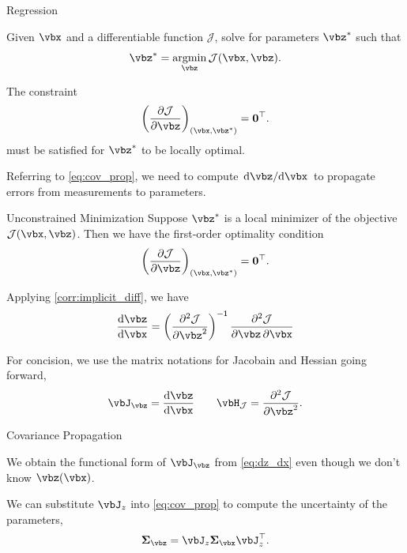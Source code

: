 \documentclass[8pt,aspectratio=169]{beamer}
\begin{document}
\begin{frame}{Regression}
  \begin{problem}[Optimization]
    Given $\vbx$ and a differentiable function $\mathcal{J}$, solve for
    parameters $\vbz^{*}$ such that
    \[
      \label{eq:minimization_problem}
      \vbz^{*} = \argmin_{\vbz} \mathcal{J}(\vbx,\vbz).
    \]
  \end{problem}

  \smallskip

  \begin{definition}
    The constraint
    \[
      \pdv{\mathcal{J}}{\vbz}_{(\vbx,\vbz^*)} = \vbzero^{\T}.
    \]
    must be satisfied for $\vbz^*$ to be locally optimal.
  \end{definition}

  \smallskip

  \begin{desiderata}
    Referring to \eqref{eq:cov_prop}, we need to compute
    $\odv{\vbz}/{\vbx}$ to propagate errors from measurements to
    parameters.
  \end{desiderata}
\end{frame}


\begin{frame}[fragile]{Unconstrained Minimization}
  Suppose $\vbz^*$ is a local minimizer of the objective
  $\mathcal{J}(\vbx,\vbz)$. Then we have the first-order optimality condition
  \[
    \pdv{\mathcal{J}}{\vbz}_{(\vbx,\vbz^*)}=\vbzero^{\T}.
  \]

  \smallskip
  
  Applying \eqref{corr:implicit_diff}, we have
  \begin{equation}
    \odv{\vbz}{\vbx} = \left(\pdv[order=2]{\mathcal{J}}{\vbz}\right)^\inv\pdv{\mathcal{J}}{\vbz,\vbx}
  \end{equation}

  \smallskip
  
  For concision, we use the matrix notations for Jacobain and Hessian going forward,
  \begin{equation}
    \label{eq:dz_dx}
    \vbJ_{\vbz} = \odv{\vbz}{\vbx} \qquad \vbH_{\mathcal{J}} =\pdv[order=2]{\mathcal{J}}{\vbz}.
  \end{equation}
\end{frame}

\begin{frame}{Covariance Propagation}
  \begin{remark}
    We obtain the functional form of $\vbJ_{\vbz}$ from
    \eqref{eq:dz_dx} even though we don't know $\vbz(\vbx)$.
  \end{remark}
  
  We can substitute $\vbJ_z$ into \eqref{eq:cov_prop} to compute the
  uncertainty of the parameters,
  \[
    \vbSigma_{\vbz} = \vbJ_z \vbSigma_{\vbx}\vbJ^{\T}_z.
  \]
\end{frame}
\end{document}
